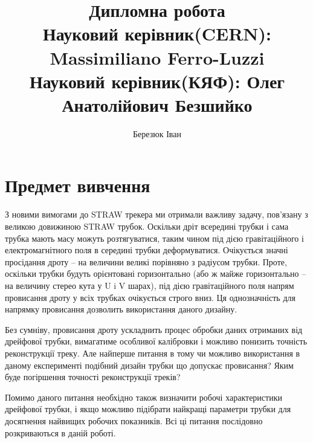 \documentclass[pdftex,14pt]{scrartcl}
\author{Березюк Іван}
\title{ Дипломна робота \\
		Науковий керівник(CERN): Massimiliano Ferro-Luzzi\\
		Науковий керівник(КЯФ): Олег Анатолійович Безшийко \\
		}
\begin{document}

	
	
		
	\newpage
	
%	
		
	\begin{spacing}{1}
	 
	\end{spacing}	

 \section{Предмет вивчення}
	
	З новими вимогами до STRAW трекера ми отримали важливу задачу, пов’язану з великою довижиною STRAW трубок. Оскільки дріт всередині трубки і сама трубка мають масу можуть розтягуватися, таким чином під дією гравітаційного і електромагнітного поля в середині трубки деформуватися. Очікується значні просідання дроту -- на величини великі порівняно з радіусом трубки. Проте, оскільки трубки будуть орієнтовані горизонтально (або ж майже горизонтально -- на величину стерео кута у U i V шарах), під дією гравітаційного поля напрям провисання дроту у всіх трубках очікується строго вниз. Ця однозначність для напрямку провисання дозволить використання даного дизайну. 
	

	Без сумніву, провисання дроту ускладнить процес обробки даних отриманих від дрейфової трубки, вимагатиме особливої калібровки  і можливо понизить точність реконструкції треку. Але найперше питання в тому чи можливо використання в даному експерименті подібний дизайн трубки що допускає провисання? Яким буде погіршення точності реконструкції треків?
	
	Помимо даного питання необхідно також визначити робочі характеристики дрейфової трубки, і якщо можливо підібрати найкращі параметри трубки для досягнення найвищих робочих показників. Всі ці питання послідовно розкриваються в даній роботі.
	
\end{document}
